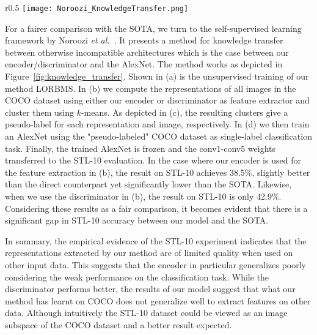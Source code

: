 \documentclass[a4paper,12pt]{report}
\begin{document}
\begin{wrapfigure}{r}{0.5\textwidth}
\texttt{[image: Noroozi\_KnowledgeTransfer.png]} 
\caption{Knowledge transfer from the LORBMS model to the AlexNet model (adapted from \cite{KnowledgeTransfer}).} 
\label{fig:knowledge_transfer}
\end{wrapfigure}
For a fairer comparison with the SOTA, we turn to the self-supervised learning framework by Noroozi \textit{et al.}~\cite{KnowledgeTransfer}. It presents a method for knowledge transfer between otherwise incompatible architectures which is the case between our encoder/discriminator and the AlexNet. The method works as depicted in Figure~\ref{fig:knowledge_transfer}. Shown in (a) is the unsupervised training of our method LORBMS. In (b) we compute the representations of all images in the COCO dataset using either our encoder or discriminator as feature extractor and cluster them using $k$-means. As depicted in (c), the resulting clusters give a pseudo-label for each representation and image, respectively. In (d) we then train an AlexNet using the "pseudo-labeled" COCO dataset as single-label classification task. Finally, the trained AlexNet is frozen and the conv1-conv5 weights transferred to the STL-10 evaluation. In the case where our encoder is used for the feature extraction in (b), the result on STL-10 achieves 38.5\%, slightly better than the direct counterpart yet significantly lower than the SOTA. Likewise, when we use the discriminator in (b), the result on STL-10 is only 42.9\%. Considering these results as a fair comparison, it becomes evident that there is a significant gap in STL-10 accuracy between our model and the SOTA.

In summary, the empirical evidence of the STL-10 experiment indicates that the representations extracted by our method are of limited quality when used on other input data. This suggests that the encoder in particular generalizes poorly considering the weak performance on the classification task. While the discriminator performs better, the results of our model suggest that what our method has learnt on COCO does not generalize well to extract features on other data. Although intuitively the STL-10 dataset could be viewed as an image subspace of the COCO dataset and a better result expected.
\end{document}
